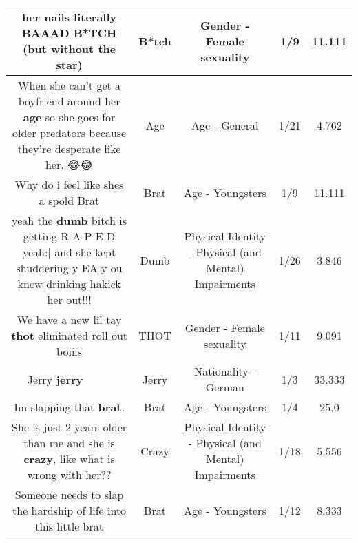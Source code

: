 \documentclass[11pt]{article}
\newlength\mylength
\begin{document}
\begin{center}
\begin{longtable}{|C{.65\mylength}|C{.30\mylength}|C{.12\mylength}|C{.12\mylength}|C{.12\mylength}|}
  \small her nails literally BAAAD \textbf{B*TCH} (but without the star)\normalsize   & B*tch & Gender - Female sexuality & 1/9 & 11.111 \\  \hline
  \small When she can't get a boyfriend around her \textbf{age} so she goes for older predators because they're desperate like her. 😂😂\normalsize   & Age & Age - General & 1/21 & 4.762 \\  \hline
  \small Why do i feel like shes a spold Brat\normalsize   & Brat & Age - Youngsters & 1/9 & 11.111 \\  \hline
  \small yeah the \textbf{dumb} bitch is getting R A P E D yeah:| and she kept shuddering y EA y ou know drinking hakick her out!!!\normalsize   & Dumb & Physical Identity - Physical (and Mental) Impairments & 1/26 & 3.846 \\  \hline
  \small We have a new lil tay \textbf{thot} eliminated roll out boiiis\normalsize   & THOT & Gender - Female sexuality & 1/11 & 9.091 \\  \hline
  \small Jerry \textbf{jerry} 🙌🏻🙌🏻😂😂😂😂\normalsize   & Jerry & Nationality - German & 1/3 & 33.333 \\  \hline
  \small Im slapping that \textbf{brat}.\normalsize   & Brat & Age - Youngsters & 1/4 & 25.0 \\  \hline
  \small She is just 2 years older than me and she is \textbf{crazy}, like what is wrong with her??\normalsize   & Crazy & Physical Identity - Physical (and Mental) Impairments & 1/18 & 5.556 \\  \hline
  \small Someone needs to slap the hardship of life into this little brat\normalsize   & Brat & Age - Youngsters & 1/12 & 8.333 \\  \hline

\end{longtable}
\end{center}
\end{document}
